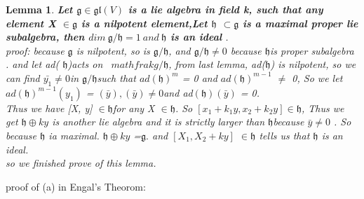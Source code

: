\documentclass[UTF8]{ctexart}
\newtheorem{lemma}{Lemma}[section]
\begin{document}
\begin{lemma}
    \textbf{ Let $\mathfrak{g} \in \mathfrak{gl}(V)$ is a lie algebra in field k,  such that any element X $\in \mathfrak{g}$ is a nilpotent element,Let $\mathfrak{h}$ $\subset \mathfrak{g}$ is a maximal proper lie subalgebra, then $dim \ \mathfrak{g}/\mathfrak{h}=1 \  and \ \mathfrak{h}$ is an ideal }. 
    \\proof:
    because $\mathfrak{g}$ is nilpotent, so is $\mathfrak{g}/\mathfrak{h}$, 
    and $\mathfrak{g}/\mathfrak{h} \neq 0$ because $\mathfrak{h} $is proper subalgebra  . and let ad( $ \mathfrak{h} $)acts on \ $mathfrak{g}/\mathfrak{h} $,
    from last lemma, ad($\mathfrak{h}$) is nilpotent, so we can find  $\bar{y_1} \neq 0 $in  $\mathfrak{g}/\mathfrak{h} $such that 
    $ad(\mathfrak{h})^m$ = 0 and $ad(\mathfrak{h})^{m-1}$ $\neq$ 0, So we let $ad(\mathfrak{h})^{m-1}(y_1)$ = $(\bar{y}),(\bar{y})\neq 0 $and ad$(\mathfrak{h})(\bar{y})$ = 0. 
    \\Thus we have [X, y] $\in \mathfrak{h} $for any X $\in \mathfrak{h}$. So $[x_1+k_1y, x_2+k_2y] \in  \mathfrak{h}$, Thus we get
    $\mathfrak{h}\oplus ky$ is another lie algebra and it is strictly larger than $\mathfrak{h} $because $\bar{y} \neq 0$ . So because $\mathfrak{h}$
     ia maximal. $\mathfrak{h}\oplus ky$ =$\mathfrak{g}.$ and $[X_1, X_2+ky]$ $\in \mathfrak{h}$ tells us that $\mathfrak{h}$ is an ideal. 
     \\so we finished prove of this lemma.
\end{lemma}
$ \  $
\\ proof of (a) in Engal's Theorom:
\end{document}
